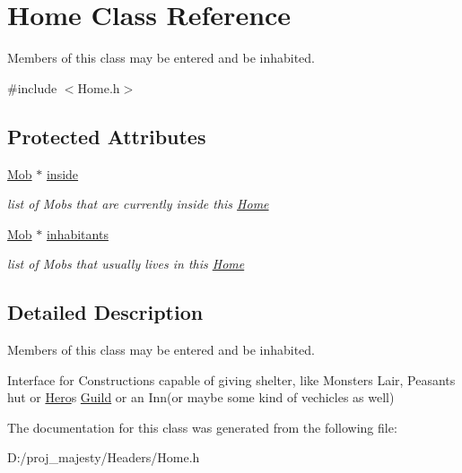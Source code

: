 \hypertarget{class_home}{}\section{Home Class Reference}
\label{class_home}


Members of this class may be entered and be inhabited.  




{\ttfamily \#include $<$Home.\+h$>$}

\subsection*{Protected Attributes}
\begin{DoxyCompactItemize}
\item 
\hyperlink{class_mob}{Mob} $\ast$ \hyperlink{class_home_a09b567233eb88f856add661dbf49b11f}{inside}\hypertarget{class_home_a09b567233eb88f856add661dbf49b11f}{}\label{class_home_a09b567233eb88f856add661dbf49b11f}

\begin{DoxyCompactList}\small\item\em list of Mobs that are currently inside this \hyperlink{class_home}{Home} \end{DoxyCompactList}\item 
\hyperlink{class_mob}{Mob} $\ast$ \hyperlink{class_home_a04af272e407f5a688d269078ac942b67}{inhabitants}\hypertarget{class_home_a04af272e407f5a688d269078ac942b67}{}\label{class_home_a04af272e407f5a688d269078ac942b67}

\begin{DoxyCompactList}\small\item\em list of Mobs that usually lives in this \hyperlink{class_home}{Home} \end{DoxyCompactList}\end{DoxyCompactItemize}


\subsection{Detailed Description}
Members of this class may be entered and be inhabited. 

Interface for Constructions capable of giving shelter, like Monster\textquotesingle{}s Lair, Peasant\textquotesingle{}s hut or \hyperlink{class_hero}{Hero}\textquotesingle{}s \hyperlink{class_guild}{Guild} or an Inn(or maybe some kind of vechicles as well) 

The documentation for this class was generated from the following file\+:\begin{DoxyCompactItemize}
\item 
D\+:/proj\+\_\+majesty/\+Headers/Home.\+h\end{DoxyCompactItemize}
